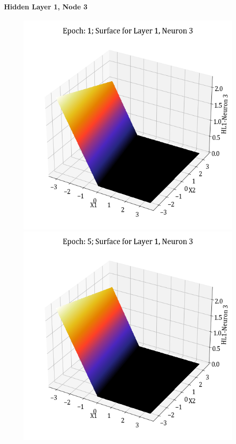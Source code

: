 \documentclass[11pt,a4paper]{article}
\begin{document}
\paragraph{Hidden Layer 1, Node 3}
\begin{figure}[H]
    \centering
    \includegraphics[scale=0.4]{images/1B_MLFFNN_E1_HL1_N3.png}
    \includegraphics[scale=0.4]{images/1B_MLFFNN_E5_HL1_N3.png}

\end{figure}
\end{document}
